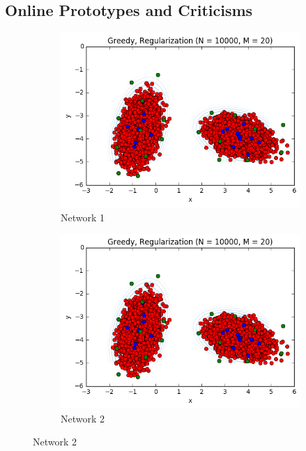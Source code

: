 \documentclass{article}
\begin{document}
	\subsection{Online Prototypes and Criticisms}
	\begin{figure}
		\centering
		\begin{subfigure}[b]{0.475\textwidth}
			\centering
			\includegraphics[width=\textwidth]{OriginalGaussian_20_2g_reg}
			\caption[Network2]%
			{{\small Network 1}}    
			\label{fig:mean and std of net14}
		\end{subfigure}
		\hfill
		\begin{subfigure}[b]{0.475\textwidth} 
			\centering 
			\includegraphics[width=\textwidth]{OriginalGaussian_20_2g_reg}
			\caption[]%
			{{\small Network 2}}    

\end{subfigure}
\end{figure}
\end{document}
